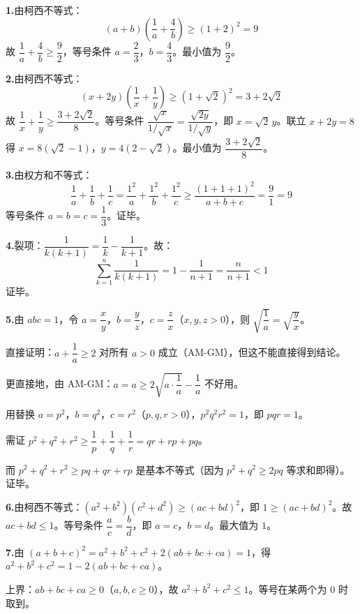 \documentclass[12pt, a4paper]{ctexart}
\begin{document}
\begin{knowledgebox}[参考答案]
\textbf{1.}\quad 由柯西不等式：
\[
(a+b)\left(\frac{1}{a}+\frac{4}{b}\right) \geqslant (1+2)^2 = 9
\]
故 $\dfrac{1}{a}+\dfrac{4}{b} \geqslant \dfrac{9}{2}$，等号条件 $a=\dfrac{2}{3}$，$b=\dfrac{4}{3}$。最小值为 $\dfrac{9}{2}$。

\medskip
\textbf{2.}\quad 由柯西不等式：
\[
(x+2y)\left(\frac{1}{x}+\frac{1}{y}\right) \geqslant \left(1+\sqrt{2}\right)^2 = 3+2\sqrt{2}
\]
故 $\dfrac{1}{x}+\dfrac{1}{y} \geqslant \dfrac{3+2\sqrt{2}}{8}$。等号条件 $\dfrac{\sqrt{x}}{1/\sqrt{x}} = \dfrac{\sqrt{2y}}{1/\sqrt{y}}$，即 $x = \sqrt{2}\,y$。联立 $x+2y=8$ 得 $x = 8(\sqrt{2}-1)$，$y = 4(2-\sqrt{2})$。最小值为 $\dfrac{3+2\sqrt{2}}{8}$。

\medskip
\textbf{3.}\quad 由权方和不等式：
\[
\frac{1}{a}+\frac{1}{b}+\frac{1}{c} = \frac{1^2}{a}+\frac{1^2}{b}+\frac{1^2}{c} \geqslant \frac{(1+1+1)^2}{a+b+c} = \frac{9}{1} = 9
\]
等号条件 $a=b=c=\dfrac{1}{3}$。证毕。

\medskip
\textbf{4.}\quad 裂项：$\dfrac{1}{k(k+1)}=\dfrac{1}{k}-\dfrac{1}{k+1}$。故：
\[
\sum_{k=1}^{n}\frac{1}{k(k+1)} = 1-\frac{1}{n+1} = \frac{n}{n+1} < 1
\]
证毕。

\medskip
\textbf{5.}\quad 由 $abc=1$，令 $a = \dfrac{x}{y}$，$b = \dfrac{y}{z}$，$c = \dfrac{z}{x}$（$x,y,z>0$），则 $\sqrt{\dfrac{1}{a}} = \sqrt{\dfrac{y}{x}}$。

直接证明：$a+\dfrac{1}{a} \geqslant 2$ 对所有 $a>0$ 成立（AM-GM），但这不能直接得到结论。

更直接地，由 AM-GM：$a = a \geqslant 2\sqrt{a\cdot\dfrac{1}{a}} - \dfrac{1}{a}$ 不好用。

用替换 $a = p^2$，$b = q^2$，$c = r^2$（$p,q,r > 0$），$p^2q^2r^2=1$，即 $pqr=1$。

需证 $p^2+q^2+r^2 \geqslant \dfrac{1}{p}+\dfrac{1}{q}+\dfrac{1}{r} = qr+rp+pq$。

而 $p^2+q^2+r^2 \geqslant pq+qr+rp$ 是基本不等式（因为 $p^2+q^2 \geqslant 2pq$ 等求和即得）。证毕。

\medskip
\textbf{6.}\quad 由柯西不等式：$(a^2+b^2)(c^2+d^2) \geqslant (ac+bd)^2$，即 $1 \geqslant (ac+bd)^2$。故 $ac+bd \leqslant 1$。等号条件 $\dfrac{a}{c}=\dfrac{b}{d}$，即 $a=c$，$b=d$。最大值为 $1$。

\medskip
\textbf{7.}\quad 由 $(a+b+c)^2 = a^2+b^2+c^2+2(ab+bc+ca) = 1$，得 $a^2+b^2+c^2 = 1-2(ab+bc+ca)$。

上界：$ab+bc+ca \geqslant 0$（$a,b,c \geqslant 0$），故 $a^2+b^2+c^2 \leqslant 1$。等号在某两个为 $0$ 时取到。


\end{knowledgebox}
\end{document}
